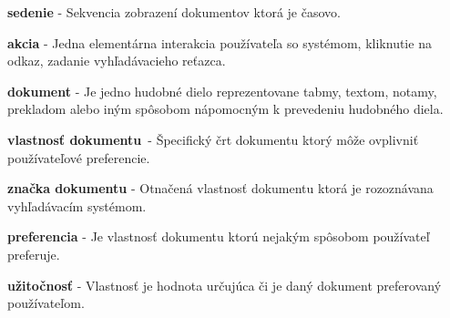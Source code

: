 \begin{my_description}
\item \textbf{sedenie} - Sekvencia zobrazení dokumentov ktorá je časovo.
\item \textbf{akcia} - Jedna elementárna interakcia používateľa so systémom,
    kliknutie na odkaz, zadanie vyhľadávacieho reťazca.
\item \textbf{dokument} - Je jedno hudobné dielo reprezentovane tabmy,
    textom, notamy, prekladom alebo iným spôsobom nápomocným k
    prevedeniu hudobného diela.
\item \textbf{vlastnosť dokumentu} - Špecifický črt dokumentu ktorý
    môže ovplivniť používateľové preferencie.
\item \textbf{značka dokumentu} - Otnačená vlastnosť dokumentu ktorá
    je rozoznávana vyhľadávacím systémom.
\item \textbf{preferencia} - Je vlastnosť dokumentu ktorú nejakým spôsobom používateľ preferuje.
\item \textbf{užitočnosť} - Vlastnosť je hodnota určujúca či je daný dokument preferovaný
    používateľom.
\end{my_description}

